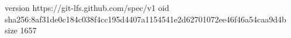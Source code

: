 version https://git-lfs.github.com/spec/v1
oid sha256:8af31de0c184c038f4cc195d4407a1154541e2d62701072ee46f46a54caa9d4b
size 1657
